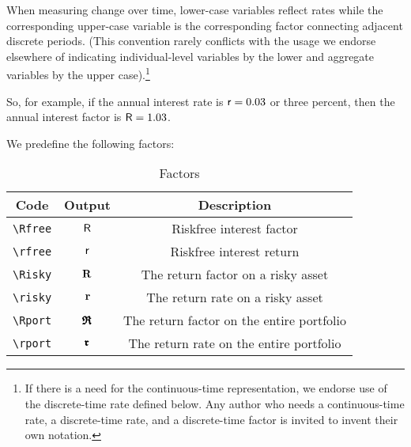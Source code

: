 
  When measuring change over time, lower-case variables reflect rates
  while the corresponding upper-case variable is the corresponding
  factor connecting adjacent discrete periods.  (This
  convention rarely conflicts with the usage we endorse elsewhere of
  indicating individual-level variables by the lower and aggregate
  variables by the upper case).\footnote{If there is a need for the continuous-time
representation, we endorse use of the discrete-time rate defined below.  Any
author who needs a continuous-time rate, a discrete-time rate, and a discrete-time factor
is invited to invent their own notation.}

So, for example, if the annual interest rate is $\mathsf{r}=0.03$ or three percent, then
the annual interest factor is $\mathsf{R}=1.03$.%

We predefine the following factors:
\begin{table}[h]
	\centering
	\begin{tabular}{|ccc|}
		\hline
Code    & Output & Description
\\ \hline
   \verb|\Rfree| & $\mathsf{R}$     & Riskfree interest factor
\\ \verb|\rfree| & $\mathsf{r}$     & Riskfree interest return
\\ \verb|\Risky| & $\mathbf{R}$     & The return factor on a risky asset
\\ \verb|\risky| & $\mathbf{r}$     & The return rate on a risky asset
\\ \verb|\Rport| & $\pmb{\mathfrak{R}}$     & The return factor on the entire portfolio
\\ \verb|\rport| & $\pmb{\mathfrak{r}}$     & The return rate on the entire portfolio
\\	\hline
	\end{tabular}
	\caption{Factors}
	\label{table:Factors}
\end{table}

